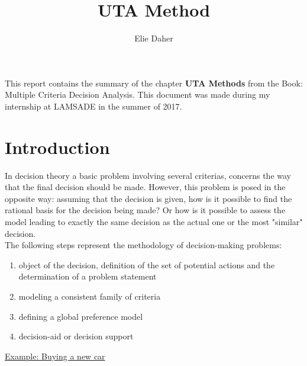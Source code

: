 \documentclass{report}
\title{UTA Method}
\author{Elie Daher}
\begin{document}
\maketitle
\abstract This report contains the summary of the chapter \textbf{UTA Methods} from the Book: Multiple Criteria Decision Analysis. This document was made during my internship at LAMSADE in the summer of 2017.
\tableofcontents{}

\chapter{Introduction}
In decision theory a basic problem involving several criterias, concerns the way that the final decision should be made. However, this problem is posed in the opposite way: assuming that the decision is given, how is it possible to find the rational basis for the decision being made? Or how is it possible to assess the model leading to exactly the same decision as the actual one or the most "similar" decision.\\

The following steps represent the methodology of decision-making problems: 
\begin{enumerate}
\item object of the decision, definition of the set of potential actions and the determination of a problem statement
\item modeling a consistent family of criteria
\item defining a global preference model
\item decision-aid or decision support
\end{enumerate}

\underline{Example: Buying a new car} \\
\end{document}
